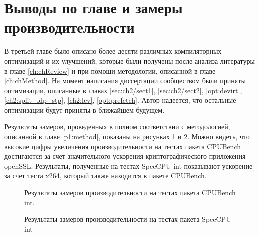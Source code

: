 \section{Выводы по главе и замеры производительности}  \label{results}
В третьей главе  было описано более десяти различных компиляторных оптимизаций и их улучшений, которые были получены после анализа литературы в главе \ref{ch:chReview} и при помощи методологии, описанной в главе \ref{ch:chMethod}. На момент написания диссертации сообществом были приняты оптимизации, описанные в главах \ref{sec:ch2/sect1}, \ref{sec:ch2/sect2}, \ref{opt:devirt}, \ref{ch2:split_ldp_stp}, \ref{ch2:lcv}, \ref{opt:prefetch}. Автор надеется, что остальные оптимизации будут приняты в ближайшем будущем.

Результаты замеров, проведенных в полном соответствии с методологией, описанной в главе \ref{p1:method}, показаны на рисунках \ref{fig:spubench_int_speedup} и \ref{fig:spec_int_speedup}. Можно видеть, что высокие цифры увеличения производительности на тестах пакета CPUBench достигаются за счет значительного ускорения криптографического приложения openSSL. Результаты, полученные на тестах SpecCPU int показывают ускорение за счет теста x264, который также находится в пакете CPUBench.

\begin{figure}[ht]
	\caption{Результаты замеров производительности на тестах  пакета CPUBench int.}\label{fig:spubench_int_speedup}
\end{figure}

\begin{figure}[ht]
	\caption{Результаты замеров производительности на тестах  пакета SpecCPU int}\label{fig:spec_int_speedup}
\end{figure}

